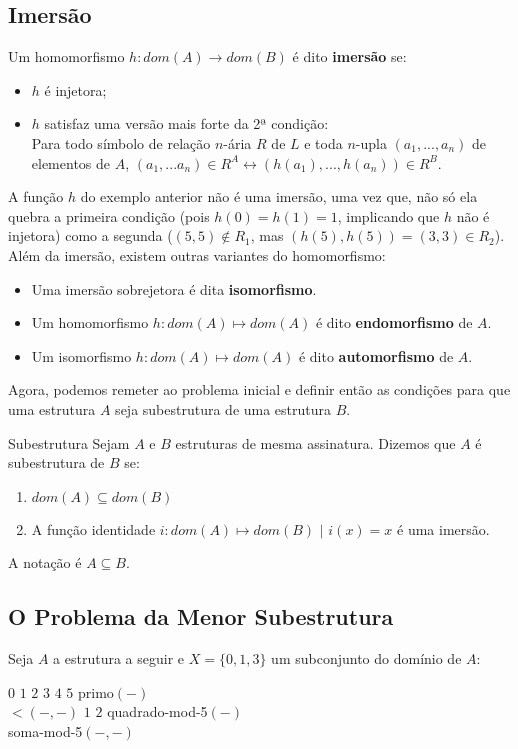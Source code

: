\subsection{Imersão}
Um homomorfismo $h: dom(A) \rightarrow dom(B)$ é dito \textbf{imersão} se:
\begin{itemize}
    \item $h$ é injetora;
    \item $h$ satisfaz uma versão mais forte da 2ª condição:
    \\ Para todo símbolo de relação $n$-ária $R$ de $L$ e toda $n$-upla $(a_1,...,a_n)$ de elementos de $A$, $(a_1,...a_n) \in R^A \leftrightarrow (h(a_1),...,h(a_n)) \in R^B$.
\end{itemize}
A função $h$ do exemplo anterior não é uma imersão, uma vez que, não só ela quebra a primeira condição (pois $h(0) = h(1) = 1$, implicando que $h$ não é injetora) como a segunda ($(5,5) \notin R_1$, mas $(h(5),h(5)) = (3,3) \in R_2$).
Além da imersão, existem outras variantes do homomorfismo:
\begin{itemize}
    \item Uma imersão sobrejetora é dita \textbf{isomorfismo}.
    \item Um homomorfismo $h: dom(A) \mapsto dom(A)$ é dito \textbf{endomorfismo} de $A$.
    \item Um isomorfismo $h: dom(A) \mapsto dom(A)$ é dito \textbf{automorfismo} de $A$.
\end{itemize}

Agora, podemos remeter ao problema inicial e definir então as condições para que uma estrutura $A$ seja subestrutura de uma estrutura $B$.
\begin{definition}{Subestrutura}
    Sejam $A$ e $B$ estruturas de mesma assinatura. Dizemos que $A$ é subestrutura de $B$ se:
    \begin{enumerate}
        \item $dom(A) \subseteq dom(B)$
        \item A função identidade $i: dom(A) \mapsto dom(B)$ $|$ $i(x) = x$ é uma imersão.
    \end{enumerate}
    A notação é $A \subseteq B$.
\end{definition}

\subsection{O Problema da Menor Subestrutura}

Seja $A$ a estrutura a seguir e $X = \{0,1,3\}$ um subconjunto do domínio de $A$:
\begin{center}
    \begin{structure}
        {}
        {$0$ $1$ $2$ $3$ $4$ $5$}
        {primo$(-)$\\$<$$(-,-)$}
        {$1$ $2$}
        {quadrado-mod-5$(-)$\\soma-mod-5$(-,-)$}
    \end{structure} 
\end{center}

